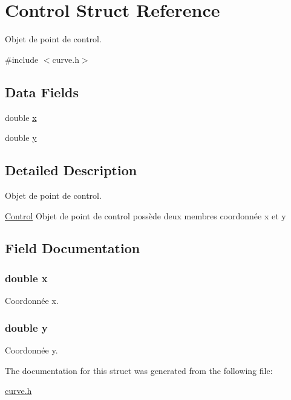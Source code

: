 \hypertarget{struct_control}{}\section{Control Struct Reference}
\label{struct_control}


Objet de point de control.  




{\ttfamily \#include $<$curve.\+h$>$}

\subsection*{Data Fields}
\begin{DoxyCompactItemize}
\item 
double \hyperlink{struct_control_af88b946fb90d5f08b5fb740c70e98c10}{x}
\item 
double \hyperlink{struct_control_ab927965981178aa1fba979a37168db2a}{y}
\end{DoxyCompactItemize}


\subsection{Detailed Description}
Objet de point de control. 

\hyperlink{struct_control}{Control} Objet de point de control possède deux membres coordonnée x et y 

\subsection{Field Documentation}
\subsubsection[{\texorpdfstring{x}{x}}]{\setlength{\rightskip}{0pt plus 5cm}double x}\hypertarget{struct_control_af88b946fb90d5f08b5fb740c70e98c10}{}\label{struct_control_af88b946fb90d5f08b5fb740c70e98c10}
Coordonnée x. 
\subsubsection[{\texorpdfstring{y}{y}}]{\setlength{\rightskip}{0pt plus 5cm}double y}\hypertarget{struct_control_ab927965981178aa1fba979a37168db2a}{}\label{struct_control_ab927965981178aa1fba979a37168db2a}
Coordonnée y. 

The documentation for this struct was generated from the following file\+:\begin{DoxyCompactItemize}
\item 
\hyperlink{curve_8h}{curve.\+h}\end{DoxyCompactItemize}
